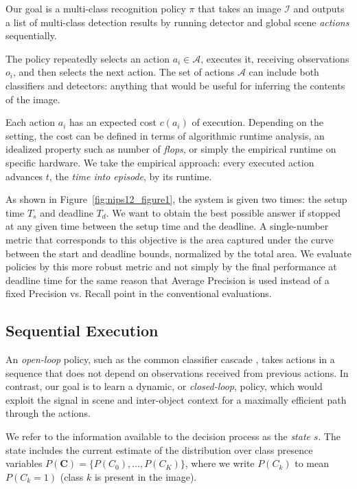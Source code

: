 Our goal is a multi-class recognition policy $\pi$ that takes an image $\mathcal{I}$ and outputs a list of multi-class detection results by running detector and global scene \emph{actions} sequentially.

The policy repeatedly selects an action $a_i \in \mathcal{A}$, executes it, receiving observations $o_i$, and then selects the next action.
The set of actions $\mathcal{A}$ can include both classifiers and detectors: anything that would be useful for inferring the contents of the image.

Each action $a_i$ has an expected cost $c(a_i)$ of execution.
Depending on the setting, the cost can be defined in terms of algorithmic runtime analysis, an idealized property such as number of \emph{flops}, or simply the empirical runtime on specific hardware.
We take the empirical approach: every executed action advances $t$, the \emph{time into episode}, by its runtime.

As shown in Figure~\ref{fig:nips12_figure1}, the system is given two times: the setup time $T_s$ and deadline $T_d$.
We want to obtain the best possible answer if stopped at any given time between the setup time and the deadline.
A single-number metric that corresponds to this objective is the area captured under the curve between the start and deadline bounds, normalized by the total area.
We evaluate policies by this more robust metric and not simply by the final performance at deadline time for the same reason that Average Precision is used instead of a fixed Precision vs. Recall point in the conventional evaluations.

\subsection{Sequential Execution}
An \emph{open-loop} policy, such as the common classifier cascade \cite{Viola2004}, takes actions in a sequence that does not depend on observations received from previous actions.
In contrast, our goal is to learn a dynamic, or \emph{closed-loop}, policy, which would exploit the signal in scene and inter-object context for a maximally efficient path through the actions.

We refer to the information available to the decision process as the \emph{state} $s$.
The state includes the current estimate of the distribution over class presence variables $P(\mathbf{C}) = \{P(C_0), \ldots, P(C_K)\}$, where we write $P(C_k)$ to mean $P(C_k=1)$ (class $k$ is present in the image).

